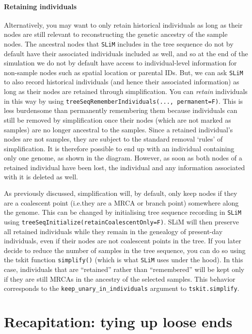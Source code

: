 \documentclass[12pt]{article}
\newcommand{\slim}[0]{\texttt{SLiM}\xspace}
\newcommand*{\ie}{i.e.\xcomma}
\begin{document}
\paragraph{Retaining individuals}
Alternatively, you may want to only retain historical individuals as long as their nodes are still
relevant to reconstructing the genetic ancestry of the sample nodes.
The ancestral nodes that \slim includes in the tree sequence do not by default have their associated individuals included as well,
and so at the end of the simulation we do not by default have access to individual-level information for non-sample nodes
such as spatial location or parental IDs.
But, we can ask \slim to also record historical individuals (and hence their associated information)
as long as their nodes are retained through simplification.
You can \emph{retain} individuals in this way by using
\verb|treeSeqRememberIndividuals(..., permanent=F)|.
This is less burdensome than permanently remembering them because individuals can still be removed by simplification
once their nodes (which are not marked as samples) are no longer ancestral to the samples.
Since a retained individual's nodes are not samples,
they are subject to the standard removal `rules' of simplification.
It is therefore possible to end up with an individual containing only one genome, as shown in the diagram.
However, as soon as both nodes of a retained individual have been lost,
the individual and any information associated with it is deleted as well.

As previously discussed, simplification will, by default, only keep nodes if they are a coalescent point
(\ie they are a MRCA or branch point) somewhere along the genome.
This can be changed by initialising tree sequence recording in \slim using
\verb|treeSeqInitialize(retainCoalescentOnly=F)|.
SLiM will then preserve all retained individuals while they remain in the genealogy of present-day individuals,
even if their nodes are not coalescent points in the tree.
If you later decide to reduce the number
of samples in the tree sequence, you can do so using the tskit function \verb|simplify()|
(which is what \slim uses under the hood).
In this case, individuals that are ``retained'' rather than ``remembered'' will be kept only
if they are still MRCAs in the ancestry of the selected samples.
This behavior corresponds to the
\verb|keep_unary_in_individuals| argument to \verb|tskit.simplify|.

\section{Recapitation: tying up loose ends} %
\end{document}
